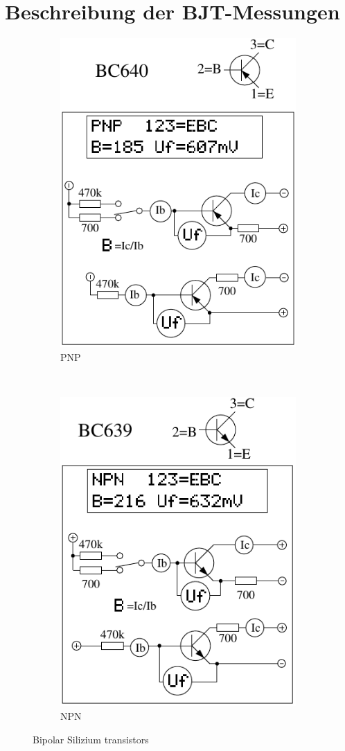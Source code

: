 \chapter{Beschreibung der BJT-Messungen}
\label{sec:BJTmeasurements}

\begin{figure}[H]
  \begin{subfigure}[b]{9cm}
    \centering
    \includegraphics[width=9cm]{../FIG/BJT_BC640.pdf}
    \caption{PNP}
    \label{fig:BJT-PNP}
  \end{subfigure}
  ~
  \begin{subfigure}[b]{9cm}
    \centering
    \includegraphics[width=9cm]{../FIG/BJT_BC639.pdf}
    \caption{NPN}
    \label{fig:BJT-NPN}
  \end{subfigure}
  \caption{Bipolar Silizium transistors}
\end{figure}


